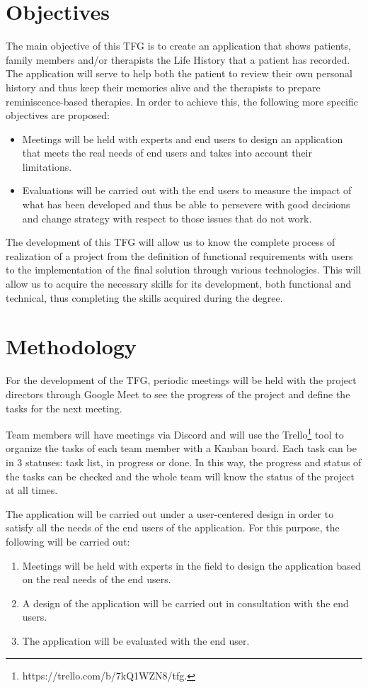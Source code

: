 \section{Objectives}
The main objective of this TFG is to create an application that shows patients, family members and/or therapists the Life History that a patient has recorded. The application will serve to help both the patient to review their own personal history and thus keep their memories alive and the therapists to prepare reminiscence-based therapies. In order to achieve this, the following more specific objectives are proposed:

\begin{itemize}
	\item Meetings will be held with experts and end users to design an application that meets the real needs of end users and takes into account their limitations.
	\item Evaluations will be carried out with the end users to measure the impact of what has been developed and thus be able to persevere with good decisions and change strategy with respect to those issues that do not work.
\end{itemize}

The development of this TFG will allow us to know the complete process of realization of a project from the definition of functional requirements with users to the implementation of the final solution through various technologies. This will allow us to acquire the necessary skills for its development, both functional and technical, thus completing the skills acquired during the degree.


\section{Methodology}
For the development of the TFG, periodic meetings will be held with the project directors through Google Meet to see the progress of the project and define the tasks for the next meeting.

Team members will have meetings via Discord and will use the Trello\footnote{https://trello.com/b/7kQ1WZN8/tfg.} tool to organize the tasks of each team member with a Kanban board. Each task can be in 3 statuses: task list, in progress or done. In this way, the progress and status of the tasks can be checked and the whole team will know the status of the project at all times.

The application will be carried out under a user-centered design in order to satisfy all the needs of the end users of the application. For this purpose, the following will be carried out:
\begin{enumerate}
	\item Meetings will be held with experts in the field to design the application based on the real needs of the end users.
	\item A design of the application will be carried out in consultation with the end users.
	\item The application will be evaluated with the end user.
\end{enumerate}

